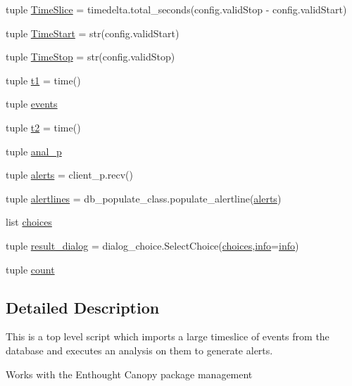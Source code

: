 \begin{DoxyCompactItemize}
\item 
tuple \hyperlink{namespacerun__archival_ad807127baa562a1a1f13c1c41dc9ff7c}{Time\-Slice} = timedelta.\-total\-\_\-seconds(config.\-valid\-Stop -\/ config.\-valid\-Start)
\item 
tuple \hyperlink{namespacerun__archival_a53d4e2d27208c61f6d716aabecf14cb9}{Time\-Start} = str(config.\-valid\-Start)
\item 
tuple \hyperlink{namespacerun__archival_adac2aadd91ae98a0f37065bf28c01999}{Time\-Stop} = str(config.\-valid\-Stop)
\item 
tuple \hyperlink{namespacerun__archival_ae4106daf64be22b10853a0d056069368}{t1} = time()
\item 
tuple \hyperlink{namespacerun__archival_a46a929fd7b61c93a6bf4aa010103b238}{events}
\item 
tuple \hyperlink{namespacerun__archival_a2179a933281124091cdc32bed8a04c7f}{t2} = time()
\item 
tuple \hyperlink{namespacerun__archival_ae9e6113a713c17cde32e43834a99436a}{anal\-\_\-p}
\item 
tuple \hyperlink{namespacerun__archival_af84da43386d4cf1664600fe963e0cc67}{alerts} = client\-\_\-p.\-recv()
\item 
tuple \hyperlink{namespacerun__archival_a589caa564ea001aef6438ad3603fb021}{alertlines} = db\-\_\-populate\-\_\-class.\-populate\-\_\-alertline(\hyperlink{namespacerun__archival_af84da43386d4cf1664600fe963e0cc67}{alerts})
\item 
list \hyperlink{namespacerun__archival_a21a8dd8c60178165d7db340928c7db9b}{choices}
\item 
tuple \hyperlink{namespacerun__archival_aab722c99065f3217e62daaeec3f84e6b}{result\-\_\-dialog} = dialog\-\_\-choice.\-Select\-Choice(\hyperlink{namespacerun__archival_a21a8dd8c60178165d7db340928c7db9b}{choices},\hyperlink{namespacerun__archival_a8ab6dc99642b199ed41dfc7ac9c88a92}{info}=\hyperlink{namespacerun__archival_a8ab6dc99642b199ed41dfc7ac9c88a92}{info})
\item 
tuple \hyperlink{namespacerun__archival_ab4dad5a97c86185353fedf0feefa562e}{count}
\end{DoxyCompactItemize}


\subsection{Detailed Description}
\begin{DoxyVerb} This is a top level script which imports
 a large timeslice of events from the database and
 executes an analysis on them to generate alerts.\end{DoxyVerb}
 Works with the Enthought Canopy package management

